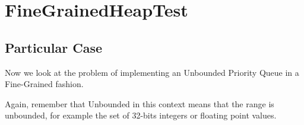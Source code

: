 \section{\textbf{FineGrainedHeapTest}}
\subsection{Particular Case}
\par
Now we look at the problem of implementing an Unbounded Priority Queue in a
Fine-Grained fashion. 
\par
Again, remember that Unbounded in this context means that the range is
unbounded, for example the set of 32-bits integers or floating point values.
\par
